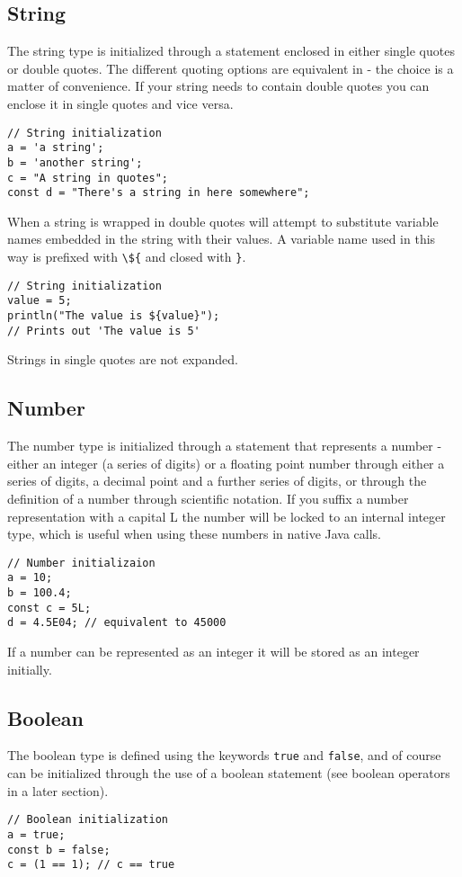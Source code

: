 \subsection{String}
The string type is initialized through a statement enclosed in either single quotes or double quotes. The different quoting options are equivalent in \Reflex - the choice is a matter of convenience. If your string needs to contain double quotes you can enclose it in single quotes and vice versa.
\begin{lstlisting}[caption={String initialization}]
// String initialization
a = 'a string';
b = 'another string';
c = "A string in quotes";
const d = "There's a string in here somewhere";
\end{lstlisting}

When a string is wrapped in double quotes \Reflex will attempt to substitute variable names embedded in the string with their values. A variable
name used in this way is prefixed with \Verb+\${+ and closed with \Verb+}+.

\begin{lstlisting}[caption={String interpretation}]
// String initialization
value = 5;
println("The value is ${value}");
// Prints out 'The value is 5'
\end{lstlisting}

Strings in single quotes are not expanded.

\subsection{Number}
The number  type is initialized through a statement that represents a number - either an integer (a series of digits) or a floating point number through either a series of digits, a decimal point and a further series of digits, or through the definition of a number through scientific notation. If you suffix a number representation with a capital L the number will be locked to an internal integer  type, which is useful when using these numbers in native Java calls.
\begin{lstlisting}[caption={Number initialization}]
// Number initializaion
a = 10;
b = 100.4;
const c = 5L;
d = 4.5E04; // equivalent to 45000
\end{lstlisting}

If a number can be represented as an integer it will be stored as an integer initially.

\subsection{Boolean}
The boolean  type is defined using the keywords \Verb+true+ and \verb+false+, and of course can be initialized through the use of a boolean statement (see boolean operators in a later section).
\begin{lstlisting}[caption={Boolean initialization}]
// Boolean initialization
a = true;
const b = false;
c = (1 == 1); // c == true
\end{lstlisting}
